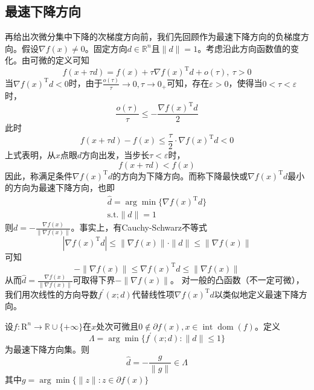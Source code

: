 \subsection{最速下降方向}
再给出次微分集中下降的次梯度方向前，我们先回顾作为最速下降方向的负梯度方向。假设$\nabla f(x)\neq 0$。固定方向$d\in \mathbb{R}^n$且$\|d\| = 1$。考虑沿此方向函数值的变化。由可微的定义可知
\[
    f(x+\tau d) = f(x) + \tau \nabla f(x)^{\mathrm{T}}d + o(\tau),\ \tau>0
\]
当$\nabla f(x)^{\mathrm{T}}d<0 $时，由于$\frac{o(\tau)}{\tau}\to 0,\tau\to 0_{+}$可知，存在$\varepsilon >0$，使得当$0<\tau<\varepsilon$时，
\[
    \dfrac{o(\tau)}{\tau}\leq -\dfrac{\nabla f(x)^{\mathrm{T}}d}{2}
\]
此时
\[
    f(x+\tau d)-f(x)\leq \dfrac{\tau}{2}\cdot \nabla f(x)^{\mathrm{T}}d< 0
\]
上式表明，从$x$点眼$d$方向出发，当步长$\tau <\varepsilon$时，
\[
    f(x+\tau d)<f(x)
\]
因此，称满足条件$\nabla f(x)^{\mathrm{T}}d$的方向为下降方向。而称下降最快或$\nabla f(x)^{\mathrm{T}}d$最小的方向为最速下降方向，也即
\[
    \begin{array}{c}
        \hat{d} = \arg\min \{\nabla f(x)^{\mathrm{T}}d\}\\
        \text{s.t.} \|d\|=1
    \end{array} 
\]
则$d = -\frac{\nabla f(x)}{\|\nabla f(x)\|}$。事实上，有Cauchy-Schwarz不等式
\[
    |\nabla f(x)^{\mathrm{T}} d|\leq \|\nabla f(x) \|\cdot \|d \|\leq \|\nabla f(x) \|
\]
可知
\[
    -\|\nabla f(x) \| \leq \nabla f(x)^{\mathrm{T}} d \leq \|\nabla f(x) \|
\]
从而$\hat{d} = \frac{\nabla f(x)}{\|\nabla f(x)\|}$可取得下界$-\|\nabla f(x) \|$。
对一般的凸函数（不一定可微），我们用次线性的方向导数$f^{\prime}(x;d)$代替线性项$\nabla f(x)^{\mathrm{T}}d$以类似地定义最速下降方向。
\begin{theorem}
    设$f:\mathrm{R}^n\to \mathbb{R}\cup \{+\infty\}$在$x$处次可微且$0\notin \partial f(x),x\in\operatorname{int}\operatorname{dom} (f)$。定义
    \[
        \Lambda = \arg\min\{ f^{\prime}(x;d):\|d\|\leq 1 \}
    \]
    为最速下降方向集。则
    \[
        \hat{d} = -\dfrac{g}{\|g\|}\in \Lambda
    \]
    其中$g = \arg\min\{ \|z\|:z\in\partial f(x) \}$
\end{theorem}

